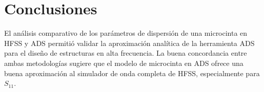 \documentclass{article}   %
\theoremstyle{mytheoremstyle}
\theoremstyle{mytheoremstyle}
\theoremstyle{myproblemstyle}
\begin{document}
\begin{minipage}{0.49\textwidth}
        {\centering\section*{\large Conclusiones}}

        El análisis comparativo de los parámetros de dispersión de una microcinta en HFSS y ADS permitió validar la
        aproximación analítica de la herramienta ADS para el diseño de estructuras en alta frecuencia. La buena concordancia
        entre ambas metodologías sugiere que el modelo de microcinta en ADS ofrece una buena aproximación al simulador de onda
        completa de HFSS, especialmente para $S_{11}$.
    \end{minipage}
\end{document}
